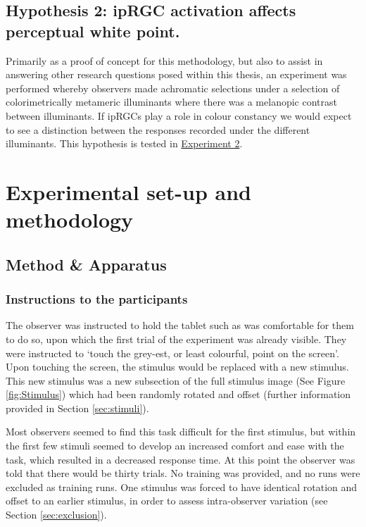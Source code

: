 \subsection*{Hypothesis 2: \gls{ipRGC} activation affects perceptual white point.}
Primarily as a proof of concept for this methodology, but also to assist in answering other research questions posed within this thesis, an experiment was performed whereby observers made achromatic selections under a selection of colorimetrically metameric illuminants where there was a melanopic contrast between illuminants. %
If \gls{ipRGCs} play a role in colour constancy we would expect to see a distinction between the responses recorded under the different illuminants. This hypothesis is tested in \hyperref[sec:exp2]{Experiment 2}.

\section{Experimental set-up and methodology}
\subsection{Method \& Apparatus}

\subsubsection{Instructions to the participants}

The observer was instructed to hold the tablet such as was comfortable for them to do so, upon which the first trial of the experiment was already visible. They were instructed to `touch the grey-est, or least colourful, point on the screen'. Upon touching the screen, the stimulus would be replaced with a new stimulus. This new stimulus was a new subsection of the full stimulus image (See Figure \ref{fig:Stimulus}) which had been randomly rotated and offset (further information provided in Section \ref{sec:stimuli}).

Most observers seemed to find this task difficult for the first stimulus, but within the first few stimuli seemed to develop an increased comfort and ease with the task, which resulted in a decreased response time. %
At this point the observer was told that there would be thirty trials. No training was provided, and no runs were excluded as training runs. One stimulus was forced to have identical rotation and offset to an earlier stimulus, in order to assess intra-observer variation (see Section \ref{sec:exclusion}).

